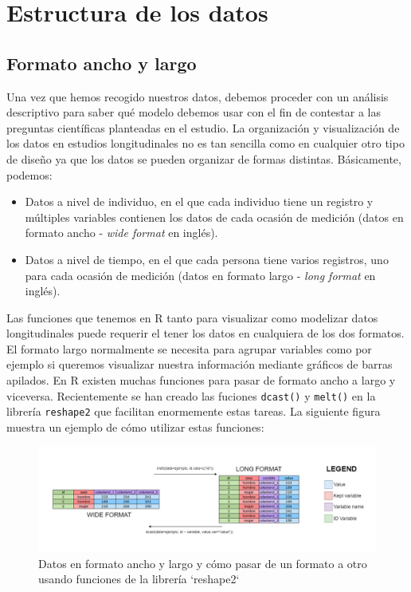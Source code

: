 \documentclass[
]{book}
\begin{document}
\hypertarget{estructura-de-los-datos}{%
\chapter{Estructura de los datos}\label{estructura-de-los-datos}}

\hypertarget{formato-ancho-y-largo}{%
\section{Formato ancho y largo}\label{formato-ancho-y-largo}}

Una vez que hemos recogido nuestros datos, debemos proceder con un análisis descriptivo para saber qué modelo debemos usar con el fin de contestar a las preguntas científicas planteadas en el estudio. La organización y visualización de los datos en estudios longitudinales no es tan sencilla como en cualquier otro tipo de diseño ya que los datos se pueden organizar de formas distintas. Básicamente, podemos:

\begin{itemize}
\item
  Datos a nivel de individuo, en el que cada individuo tiene un registro y múltiples variables contienen los datos de cada ocasión de medición (datos en formato ancho - \emph{wide format} en inglés).
\item
  Datos a nivel de tiempo, en el que cada persona tiene varios registros, uno para cada ocasión de medición (datos en formato largo - \emph{long format} en inglés).
\end{itemize}

Las funciones que tenemos en R tanto para visualizar como modelizar datos longitudinales puede requerir el tener los datos en cualquiera de los dos formatos. El formato largo normalmente se necesita para agrupar variables como por ejemplo si queremos visualizar nuestra información mediante gráficos de barras apilados. En R existen muchas funciones para pasar de formato ancho a largo y viceversa. Recientemente se han creado las fuciones \texttt{dcast()} y \texttt{melt()} en la librería \texttt{reshape2} que facilitan enormemente estas tareas. La siguiente figura muestra un ejemplo de cómo utilizar estas funciones:

\begin{figure}
\includegraphics[width=22.22in]{fig/ejemplo_img_final} \caption{Datos en formato ancho y largo y cómo pasar de un formato a otro usando funciones de la librería `reshape2`}\label{fig:unnamed-chunk-9}
\end{figure}
\end{document}
